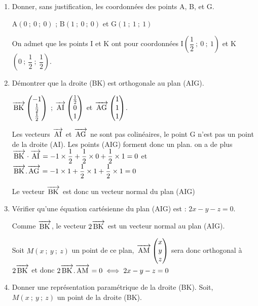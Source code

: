 \documentclass[11pt]{article}
\newcommand{\vect}[1]{\overrightarrow{\,\mathstrut#1\,}}
\begin{document}
\begin{enumerate}
\item Donner, sans justification, les coordonnées des points A, B, et G.

$\text{A}(0~;~0~;~0)$ ; $\text{B}(1~;~0~;~0)$ et $\text{G}(1~;~1~;~1)$

On admet que les points I et K ont pour coordonnées I$\left(\dfrac{1}{2}~;~0~;~1\right)$ et K$\left(0~;~\dfrac{1}{2}~;~\dfrac{1}{2}\right)$.
\item Démontrer que la droite (BK) est orthogonale au plan (AIG).

$\vect{\text{BK}}\begin{pmatrix}
-1 \\ \frac{1}{2}\\\frac{1}{2}
\end{pmatrix} $ ; 
$\vect{\text{AI}}\begin{pmatrix}
\frac{1}{2} \\ 0\\1
\end{pmatrix} $ et $\vect{\text{AG}}\begin{pmatrix}
1 \\ 1\\1
\end{pmatrix}$.

Les vecteurs $\vect{\text{AI}}$ et $\vect{\text{AG}}$ ne sont pas colinéaires, le point G n'est pas un point de la droite (AI). Les points (AIG) forment donc un plan.
on a de plus $\vect{\text{BK}}\cdot \vect{\text{AI}}= -1\times \dfrac{1}{2}+\dfrac{1}{2}\times 0+\dfrac{1}{2}\times 1 =0$ 
et $\vect{\text{BK}}.\vect{\text{AG}}=-1\times 1+\dfrac{1}{2}\times 1+\dfrac{1}{2}\times 1 =0$ 

Le vecteur $\vect{\text{BK}}$ est donc un vecteur normal du plan (AIG)
\item Vérifier qu'une équation cartésienne du plan (AIG) est : $2x - y - z = 0$.

Comme $\vect{\text{BK}}$, le vecteur $2\vect{\text{BK}}$ est un vecteur normal au plan (AIG).

Soit $M(x~;~y~;~z)$ un point de ce plan, $\vect{\text{AM}}\begin{pmatrix}
x \\ y\\z
\end{pmatrix} $ sera donc orthogonal à $2\vect{\text{BK}}$ et donc $2\vect{\text{BK}}.\vect{\text{AM}}=0 \iff 2x - y - z = 0$
\item Donner une représentation paramétrique de la droite (BK).
Soit, $M(x~;~y~;~z)$ un point de la droite (BK). 


\end{enumerate}
\end{document}
